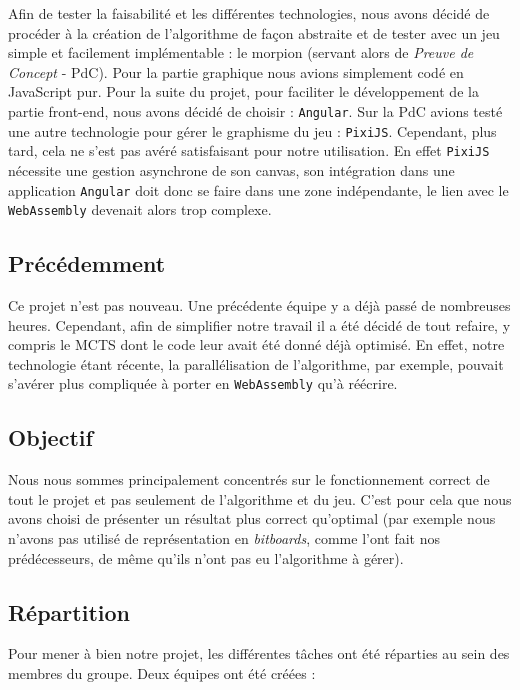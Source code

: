 \documentclass[a4paper,11pt]{article}
\begin{document}
Afin de tester la faisabilité et les différentes technologies, nous
avons décidé de procéder à la création de l'algorithme de façon
abstraite et de tester avec un jeu simple et facilement implémentable :
le morpion (servant alors de \emph{Preuve de Concept} - PdC). Pour la
partie graphique nous avions simplement codé en JavaScript pur. Pour la
suite du projet, pour faciliter le développement de la partie front-end,
nous avons décidé de choisir : \texttt{Angular}. Sur la PdC avions testé
une autre technologie pour gérer le graphisme du jeu : \texttt{PixiJS}.
Cependant, plus tard, cela ne s'est pas avéré satisfaisant pour notre
utilisation. En effet \texttt{PixiJS} nécessite une gestion asynchrone
de son canvas, son intégration dans une application \texttt{Angular}
doit donc se faire dans une zone indépendante, le lien avec le
\texttt{WebAssembly} devenait alors trop complexe.

\subsection{Précédemment}\label{pruxe9cuxe9demment}

Ce projet n'est pas nouveau. Une précédente équipe y a déjà passé de
nombreuses heures. Cependant, afin de simplifier notre travail il a été
décidé de tout refaire, y compris le MCTS dont le code leur avait été
donné déjà optimisé. En effet, notre technologie étant récente, la
parallélisation de l'algorithme, par exemple, pouvait s'avérer plus
compliquée à porter en \texttt{WebAssembly} qu'à réécrire.

\subsection{Objectif}\label{objectif}

Nous nous sommes principalement concentrés sur le fonctionnement correct
de tout le projet et pas seulement de l'algorithme et du jeu. C'est pour
cela que nous avons choisi de présenter un résultat plus correct
qu'optimal (par exemple nous n'avons pas utilisé de représentation en
\emph{bitboards}, comme l'ont fait nos prédécesseurs, de même qu'ils
n'ont pas eu l'algorithme à gérer).

\subsection{Répartition}\label{ruxe9partition}

Pour mener à bien notre projet, les différentes tâches ont été réparties
au sein des membres du groupe. Deux équipes ont été créées :
\end{document}
